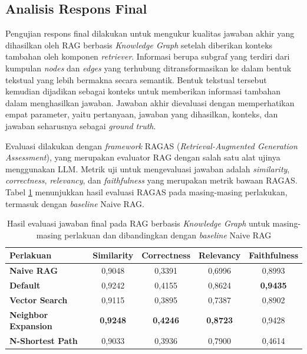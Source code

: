 \subsection{Analisis Respons Final}
Pengujian respons final dilakukan untuk mengukur kualitas jawaban akhir yang dihasilkan oleh RAG berbasis \textit{Knowledge Graph} setelah diberikan konteks tambahan oleh komponen \textit{retriever}.
Informasi berupa subgraf yang terdiri dari kumpulan \textit{nodes} dan \textit{edges} yang terhubung ditransformasikan ke dalam bentuk tekstual yang lebih bermakna secara semantik.
Bentuk tekstual tersebut kemudian dijadikan sebagai konteks untuk memberikan informasi tambahan dalam menghasilkan jawaban.
Jawaban akhir dievaluasi dengan memperhatikan empat parameter, yaitu pertanyaan, jawaban yang dihasilkan, konteks, dan jawaban seharusnya sebagai \textit{ground truth}.

Evaluasi dilakukan dengan \textit{framework} RAGAS (\textit{Retrieval-Augmented Generation Assessment}), yang merupakan evaluator RAG dengan salah satu alat ujinya menggunakan LLM.
Metrik uji untuk mengevaluasi jawaban adalah \textit{similarity}, \textit{correctness}, \textit{relevancy}, dan \textit{faithfulness} yang merupakan metrik bawaan RAGAS.
Tabel \ref{tab:final-answer-evaluation-result} menunjukkan hasil evaluasi RAGAS pada masing-masing perlakukan, termasuk dengan \textit{baseline} Naive RAG.

\begin{table}[H]
	\centering
	\caption{Hasil evaluasi jawaban final pada RAG berbasis \textit{Knowledge Graph} untuk masing-masing perlakuan dan dibandingkan dengan \textit{baseline} Naive RAG}
	\label{tab:final-answer-evaluation-result}
	\begin{tabular}{|l|c|c|c|c|}
		\hline
		\textbf{Perlakuan}          & \textbf{Similarity} & \textbf{Correctness} & \textbf{Relevancy} & \textbf{Faithfulness} \\
		\hline \hline
		\textbf{Naive RAG}          & 0,9048              & 0,3391               & 0,6996             & 0,8993                \\
		\hline
		\textbf{Default}            & 0,9242              & 0,4155               & 0,8624             & \textbf{0,9435}       \\
		\hline
		\textbf{Vector Search}      & 0,9115              & 0,3895               & 0,7387             & 0,8902                \\
		\hline
		\textbf{Neighbor Expansion} & \textbf{0,9248}     & \textbf{0,4246}      & \textbf{0,8723}    & 0,9428                \\
		\hline
		\textbf{N-Shortest Path}    & 0,9033              & 0,3936               & 0,7900             & 0,4614                \\
		\hline
	\end{tabular}
\end{table}

